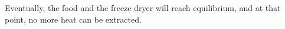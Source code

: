 Eventually, the food and the freeze dryer will reach equilibrium, and at that point, no more heat can be extracted.